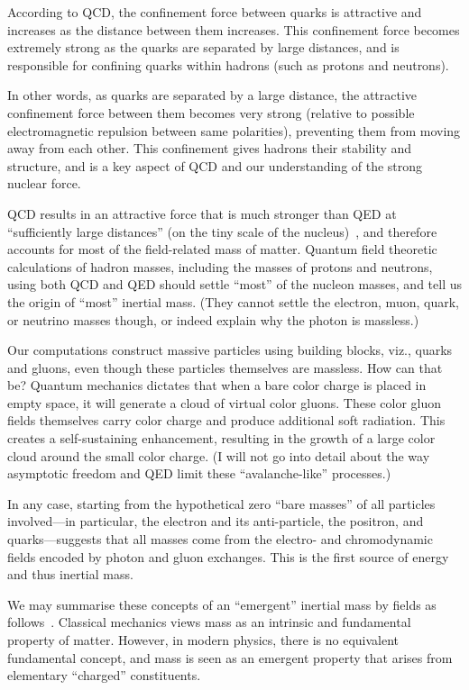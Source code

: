 According to QCD, the confinement force between quarks is attractive and increases as the distance between them increases.
This confinement force becomes extremely strong as the quarks are separated by large distances,
and is responsible for confining quarks within hadrons (such as protons and neutrons).

In other words, as quarks are separated by a large distance,
the attractive confinement force between them becomes very strong
(relative to possible electromagnetic repulsion between same polarities),
preventing them from moving away from each other.
This confinement gives hadrons their stability and structure,
and is a key aspect of QCD and our understanding of the strong nuclear force.

QCD results in an attractive force that is much stronger than QED at ``sufficiently large distances'' (on the tiny scale of the nucleus)~\cite{Gross_1999},
and therefore accounts for most of the field-related mass of matter.
Quantum field theoretic calculations of hadron masses,
including the masses of protons and neutrons, using both QCD and QED should settle ``most'' of the nucleon masses, and
 tell us the origin of ``most'' inertial mass.
(They cannot settle the electron, muon, quark, or neutrino masses though, or indeed explain why the photon is massless.)

Our computations construct massive particles using building blocks, viz., quarks
and gluons, even though these particles themselves are massless.
How can that be?
Quantum mechanics dictates that when a bare color charge is placed in empty space,
it will generate a cloud of virtual color gluons.
These color gluon fields themselves carry color charge and produce additional soft radiation.
This creates a self-sustaining enhancement, resulting in the growth of a large color cloud around the small color charge.
(I will not go into detail about the way asymptotic freedom and QED limit these ``avalanche-like'' processes.)

In any case, starting from the hypothetical zero ``bare masses'' of all particles
involved---in particular, the electron and its anti-particle, the positron, and
quarks---suggests that all masses come from the electro- and chromodynamic
fields encoded by photon and gluon exchanges.
This is the first source of energy and thus inertial mass.

We may summarise these concepts of an ``emergent'' inertial mass by fields as
follows~\cite{Wilczek_2012}. Classical mechanics views mass as an intrinsic
and fundamental property of matter. However, in modern physics, there is no
equivalent fundamental concept, and mass is seen as an emergent property
that arises from elementary ``charged'' constituents.

